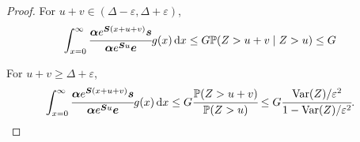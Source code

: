 \begin{proof}
	For \(u+v\in (\Delta-\varepsilon, \Delta + \varepsilon)\),
	\begin{align}
		\int_{x=0}^\infty \cfrac{\boldsymbol \alpha  e^{\boldsymbol{S} (x+u+v)} \boldsymbol s}{\boldsymbol \alpha  e^{\boldsymbol{S} u} \boldsymbol e} g(x)\, \mathrm{d} x & \leq G \mathbb P(Z>u+v\mid Z>u) \leq G
	\end{align}
	
	For \(u+v \geq \Delta + \varepsilon\),
	\begin{align}
		\int_{x=0}^\infty \cfrac{\boldsymbol \alpha  e^{\boldsymbol{S} (x+u+v)} \boldsymbol s}{\boldsymbol \alpha  e^{\boldsymbol{S} u} \boldsymbol e} g(x)\, \mathrm{d} x & \leq G \cfrac{\mathbb P(Z>u+v)}{\mathbb P( Z>u)} 
		 \leq G\cfrac{\mathrm{Var}(Z)/\varepsilon^2}{1-\mathrm{Var}(Z)/\varepsilon^2} .
	\end{align}
\end{proof}


	
